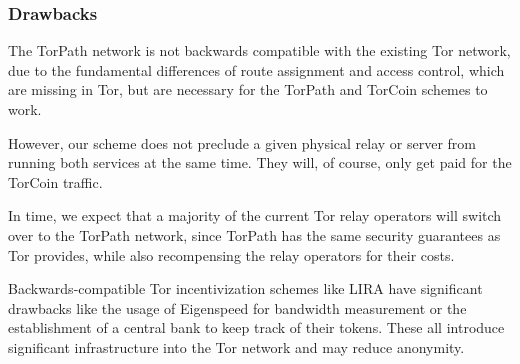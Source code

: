 \subsubsection{Drawbacks} The TorPath network is not backwards compatible with
the existing Tor network, due to the fundamental differences of route
assignment and access control, which are missing in Tor, but are necessary for
the TorPath and TorCoin schemes to work.

However, our scheme does not preclude a given physical relay or server from
running both services at the same time. They will, of course, only get paid
for the TorCoin traffic.

In time, we expect that a majority of the current Tor
relay operators will switch over to the TorPath network, since TorPath has the
same security guarantees as Tor provides, while also recompensing the relay
operators for their costs.

Backwards-compatible Tor incentivization schemes like LIRA have significant
drawbacks like the usage of Eigenspeed for bandwidth measurement or the
establishment of a central bank to keep track of their tokens. These all
introduce significant infrastructure into the Tor network and may reduce
anonymity.
